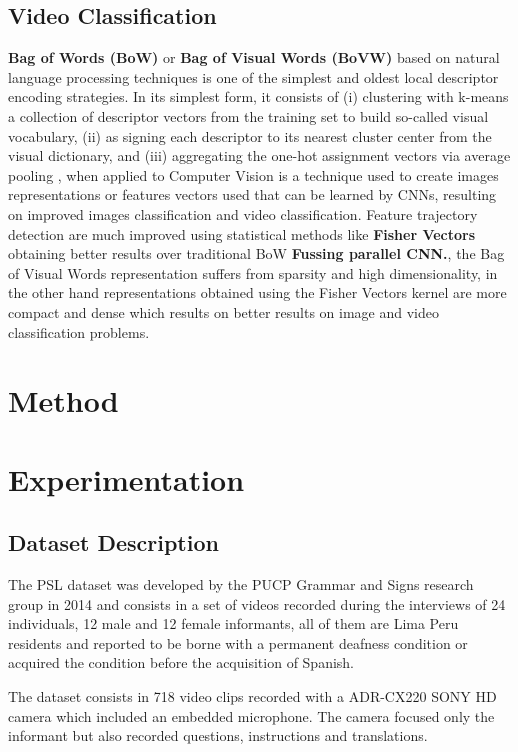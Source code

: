 \documentclass[twocolumn,conference]{article}
\begin{document}
\subsection{Video Classification}
\textbf{Bag of Words (BoW)} or \textbf{Bag of Visual Words (BoVW)} based on natural language processing techniques is one of the simplest and oldest local descriptor encoding strategies. In its simplest form, it consists of (i) clustering with k-means a collection of descriptor vectors from the training set to build so-called visual vocabulary, (ii) as signing each descriptor to its nearest cluster center from the visual dictionary, and (iii) aggregating the one-hot assignment vectors via average pooling \cite{wang2019hallucinating}, when applied to Computer Vision is a technique used to create images representations or features vectors used that can be learned by CNNs, resulting on improved images classification and video classification. 
Feature trajectory detection are much improved using statistical methods like \textbf{Fisher Vectors} obtaining better results over traditional BoW \textbf{Fussing parallel CNN.}, the Bag of Visual Words representation suffers from sparsity and high dimensionality, in the other hand representations obtained using the Fisher Vectors kernel are more compact and dense which results on better results on image and video classification problems.
\section{Method}\label{method}
\section{Experimentation}\label{experimentation}
\subsection{Dataset Description \cite{lsp_dataset}}\label{datasetdesc}
The PSL dataset was developed by the PUCP Grammar and Signs research group in 2014 and consists in a set of videos recorded during the interviews of 24 individuals, 12 male and 12 female informants, all of them are Lima Peru residents and reported to be borne with a permanent deafness condition or acquired the condition before the acquisition of Spanish. 

The dataset consists in 718 video clips recorded with a ADR-CX220 SONY HD camera which included an embedded microphone. The camera focused only the informant but also recorded questions, instructions and translations.
\end{document}
